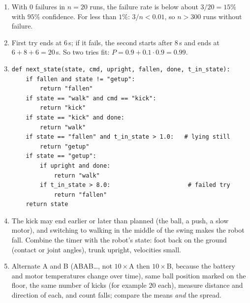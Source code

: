 \begin{enumerate}[label=\textbf{\ansnum.\arabic*}]
  \item With $0$ failures in $n=20$ runs, the failure rate is below about $3/20=15\%$ with $95\%$ confidence. For less than $1\%$: $3/n<0.01$, so $n>300$ runs without failure.
  \item First try ends at $6$\,s; if it fails, the second starts after $8$\,s and ends at $6+8+6=20$\,s. So two tries fit: $P=0.9+0.1\cdot0.9=0.99$.
  \item
\begin{verbatim}
def next_state(state, cmd, upright, fallen, done, t_in_state):
    if fallen and state != "getup":
        return "fallen"
    if state == "walk" and cmd == "kick":
        return "kick"
    if state == "kick" and done:
        return "walk"
    if state == "fallen" and t_in_state > 1.0:   # lying still
        return "getup"
    if state == "getup":
        if upright and done:
            return "walk"
        if t_in_state > 8.0:                      # failed try
            return "fallen"
    return state
\end{verbatim}
  \item The kick may end earlier or later than planned (the ball, a push, a slow motor), and switching to walking in the middle of the swing makes the robot fall. Combine the timer with the robot's state: foot back on the ground (contact or joint angles), trunk upright, velocities small.
  \item Alternate A and B (ABAB\dots, not $10\times$A then $10\times$B, because the battery and motor temperatures change over time), same ball position marked on the floor, the same number of kicks (for example $20$ each), measure distance and direction of each, and count falls; compare the means \emph{and} the spread.
\end{enumerate}
